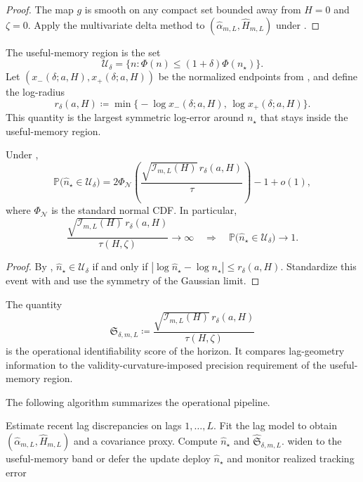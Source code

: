 \begin{proof}
The map $g$ is smooth on any compact set bounded away from $H=0$ and
$\zeta=0$. Apply the multivariate delta method to
$(\widehat \alpha_{m,L},\widehat H_{m,L})$ under
.
\end{proof}

The useful-memory region is the set
\[
  \mathcal U_\delta = \{n : \Phi(n) \le (1+\delta)\Phi(n_\star)\}.
\]
Let $(x_-(\delta;a,H),x_+(\delta;a,H))$ be the normalized endpoints from
, and define the log-radius
\[
  r_\delta(a,H)
  \coloneqq
  \min\bigl\{-\log x_-(\delta;a,H),\,\log x_+(\delta;a,H)\bigr\}.
\]
This quantity is the largest symmetric log-error around $n_\star$ that stays
inside the useful-memory region.

\begin{theorem}
\label{thm:operational_identifiability}
Under ,
\[
  \mathbb P\bigl(\widehat n_\star \in \mathcal U_\delta\bigr)
  =
  2\Phi_{\mathcal N}\!\left(
    \frac{\sqrt{\mathcal I_{m,L}(H)}\,r_\delta(a,H)}{\tau}
  \right) - 1 + o(1),
\]
where $\Phi_{\mathcal N}$ is the standard normal CDF. In particular,
\[
  \frac{\sqrt{\mathcal I_{m,L}(H)}\,r_\delta(a,H)}{\tau(H,\zeta)} \to \infty
  \quad \Longrightarrow \quad
  \mathbb P\bigl(\widehat n_\star \in \mathcal U_\delta\bigr) \to 1.
\]
\end{theorem}

\begin{proof}
By ,
$\widehat n_\star \in \mathcal U_\delta$ if and only if
$|\log \widehat n_\star - \log n_\star| \le r_\delta(a,H)$. Standardize this
event with  and use the symmetry of the Gaussian
limit.
\end{proof}

The quantity
\[
  \mathfrak S_{\delta,m,L}
  \coloneqq
  \frac{\sqrt{\mathcal I_{m,L}(H)}\,r_\delta(a,H)}{\tau(H,\zeta)}
\]
is the operational identifiability score of the horizon. It compares
lag-geometry information to the validity-curvature-imposed precision requirement of the
useful-memory region.

The following algorithm summarizes the operational pipeline.
\begin{algorithm}[!htbp]
\caption{Operational validity-observability pipeline}
\label{alg:horizon_inference}
\footnotesize
\begin{algorithmic}[1]
\State Estimate recent lag discrepancies on lags $1,\dots,L$.
\State Fit the lag model to obtain $(\widehat\alpha_{m,L},\widehat H_{m,L})$ and a covariance proxy.
\State Compute $\widehat n_\star$ and $\widehat{\mathfrak S}_{\delta,m,L}$.
  \State widen to the useful-memory band or defer the update
\Else
  \State deploy $\widehat n_\star$ and monitor realized tracking error
\EndIf
\end{algorithmic}
\end{algorithm}

